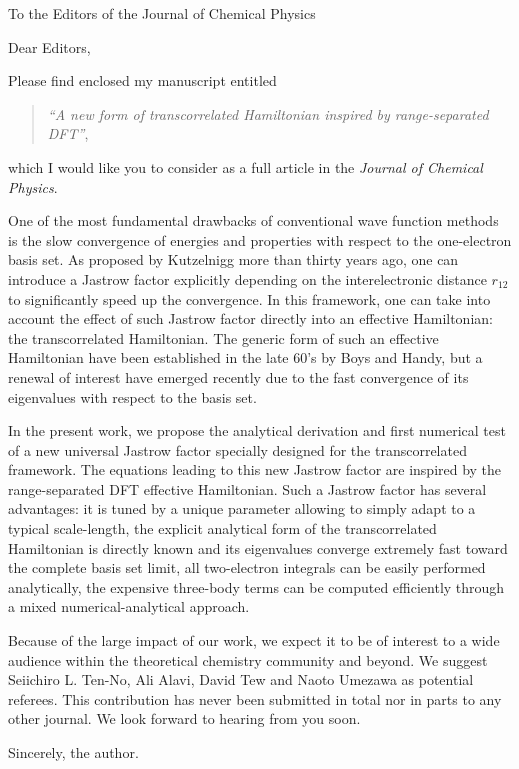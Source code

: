 \documentclass[10pt]{letter}
\begin{document}
\begin{letter}%
{To the Editors of the Journal of Chemical Physics}

\opening{Dear Editors,}

Please find enclosed my manuscript entitled
\begin{quote}
\textit{``A new form of transcorrelated Hamiltonian inspired by range-separated DFT''}, 
\end{quote}
which I would like you to consider as a full article in the \textit{Journal of Chemical Physics}.

One of the most fundamental drawbacks of conventional wave function methods is the slow convergence of energies and properties with respect to the one-electron basis set.
As proposed by Kutzelnigg more than thirty years ago, one can introduce a Jastrow factor explicitly depending on the interelectronic distance $r_{12}$ to significantly speed up the convergence. 
In this framework, one can take into account the effect of such Jastrow factor directly into an effective Hamiltonian: the transcorrelated Hamiltonian. The generic form of such an effective Hamiltonian have been established in the late 60's by Boys and Handy, but a renewal of interest have emerged recently due to the fast convergence of its eigenvalues with respect to the basis set. 

In the present work, we propose the analytical derivation and first numerical test of a new universal Jastrow factor specially designed for the transcorrelated framework. The equations leading to this new Jastrow factor are inspired by the range-separated DFT effective Hamiltonian. Such a Jastrow factor has several advantages: it is tuned by a unique parameter allowing to simply adapt to a typical scale-length, the explicit analytical form of the transcorrelated Hamiltonian is directly known and its eigenvalues converge extremely fast toward the complete basis set limit, all two-electron integrals can be easily performed analytically, the expensive three-body terms can be computed efficiently through a mixed numerical-analytical approach.  

Because of the large impact of our work, we expect it to be of interest to a wide audience within the theoretical chemistry community and beyond.
We suggest Seiichiro L. Ten-No, Ali Alavi, David Tew and Naoto Umezawa as potential referees.
This contribution has never been submitted in total nor in parts to any other journal. 
We look forward to hearing from you soon.

\closing{Sincerely, the author.}


\end{letter}
\end{document}
